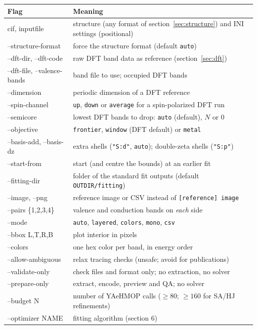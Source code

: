 \documentclass[11pt,a4paper]{article}
\newcommand{\cmd}[1]{\texttt{#1}}
\renewcommand{\_}{\origunderscore\allowbreak}
\begin{document}
\begin{center}
\small
\begin{tabularx}{\textwidth}{>{\ttfamily}l L}
\toprule
\normalfont Flag & Meaning \\
\midrule
cif, input\_file & structure (any format of section~\ref{sec:structure}) and INI settings (positional) \\
--structure-format & force the structure format (default \cmd{auto}) \\
--dft-dir, --dft-code & raw DFT band data as reference (section~\ref{sec:dft}) \\
--dft-file, --valence-bands & band file to use; occupied DFT bands \\
--dimension & periodic dimension of a DFT reference \\
--spin-channel & \cmd{up}, \cmd{down} or \cmd{average} for a spin-polarized DFT run \\
--semicore & lowest DFT bands to drop: \cmd{auto} (default), $N$ or 0 \\
--objective & \cmd{frontier}, \cmd{window} (DFT default) or \cmd{metal} \\
--basis-add, --basis-dz & extra shells (\cmd{"S:d"}, \cmd{auto}); double-zeta shells (\cmd{"S:p"}) \\
--start-from & start (and centre the bounds) at an earlier fit \\
--fitting-dir & folder of the standard fit outputs (default \cmd{OUTDIR/fitting}) \\
--image, --png & reference image or CSV instead of \cmd{[reference] image} \\
--pairs \{1,2,3,4\} & valence and conduction bands on \emph{each} side \\
--mode & \cmd{auto}, \cmd{layered}, \cmd{colors}, \cmd{mono}, \cmd{csv} \\
--bbox L,T,R,B & plot interior in pixels \\
--colors & one hex color per band, in energy order \\
--allow-ambiguous & relax tracing checks (unsafe; avoid for publications) \\
--validate-only & check files and format only; no extraction, no solver \\
--prepare-only & extract, encode, preview and QA; no solver \\
--budget N & number of YAeHMOP calls ($\ge 80$; $\ge 160$ for SA/HJ refinements) \\
--optimizer NAME & fitting algorithm (section 6) \\

\end{tabularx}
\end{center}
\end{document}
